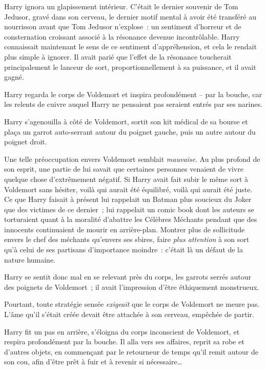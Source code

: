 Harry ignora un glapissement intérieur. C'était le dernier souvenir de Tom Jedusor, gravé dans son cerveau, le dernier motif mental à avoir été transféré au nourrisson avant que Tom Jedusor n'explose~: un sentiment d'horreur et de consternation croissant associé à la résonance devenue incontrôlable. Harry connaissait maintenant le sens de ce sentiment d'appréhension, et cela le rendait plus simple à ignorer. Il avait parié que l'effet de la résonance toucherait principalement le lanceur de sort, proportionnellement à sa puissance, et il avait gagné.

Harry regarda le corps de Voldemort et inspira profondément -- par la bouche, car les relents de cuivre auquel Harry ne pensaient pas seraient entrés par ses narines.

Harry s'agenouilla à côté de Voldemort, sortit son kit médical de sa bourse et plaça un garrot auto-serrant autour du poignet gauche, puis un autre autour du poignet droit.

Une telle préoccupation envers Voldemort semblait \emph{mauvaise}. Au plus profond de son esprit, une partie de lui savait que certaines personnes venaient de vivre quelque chose d'extrêmement négatif. Si Harry avait fait subir le même sort à Voldemort sans hésiter, voilà qui aurait été équilibré, voilà qui aurait été juste. Ce que Harry faisait à présent lui rappelait un Batman plus soucieux du Joker que des victimes de ce dernier~; lui rappelait un comic book dont les auteurs se torturaient quant à la moralité d'abattre les Célèbres Méchants pendant que des innocents continuaient de mourir en arrière-plan. Montrer plus de sollicitude envers le chef des méchants qu'envers ses sbires, faire \emph{plus attention} à son sort qu'à celui de ses partisans d'importance moindre~: c'était là un défaut de la nature humaine.

Harry se sentit donc mal en se relevant près du corps, les garrots serrés autour des poignets de Voldemort~; il avait l'impression d'être éthiquement monstrueux.

Pourtant, toute stratégie sensée \emph{exigeait} que le corps de Voldemort ne meure pas. L'âme qu'il s'était créée devait être attachée à son cerveau, empêchée de partir.

Harry fit un pas en arrière, s'éloigna du corps inconscient de Voldemort, et respira profondément par la bouche. Il alla vers ses affaires, reprit sa robe et d'autres objets, en commençant par le retourneur de temps qu'il remit autour de son cou, afin d'être prêt à fuir et à revenir si nécessaire…

